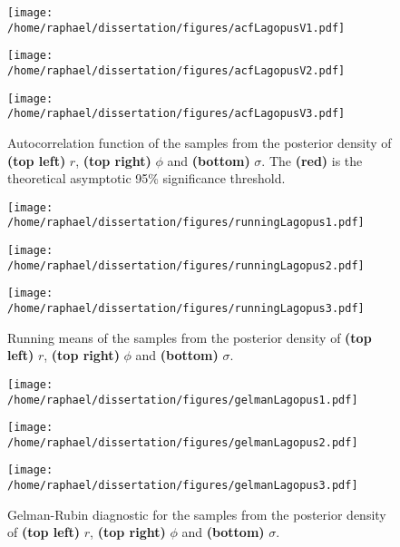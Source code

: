 \documentclass[12pt]{article}
\begin{document}
	\begin{figure}[htb]
		\centering
		\begin{minipage}{0.4\textwidth}
			\centering
			\texttt{[image: /home/raphael/dissertation/figures/acfLagopusV1.pdf]}
		\end{minipage}
		\begin{minipage}{0.4\textwidth}
			\centering
			\texttt{[image: /home/raphael/dissertation/figures/acfLagopusV2.pdf]}
		\end{minipage}
		\begin{minipage}{0.4\textwidth}
			\centering
			\texttt{[image: /home/raphael/dissertation/figures/acfLagopusV3.pdf]}
		\end{minipage}
		\caption{Autocorrelation function of the samples from the posterior density of \textbf{(top left)} $r$, \textbf{(top right)} $\phi$ and \textbf{(bottom)} $\sigma$. The \textbf{(red)} is the theoretical asymptotic 95\% significance threshold.}
		\label{fig:acfLagopus}
	\end{figure}
	
	\begin{figure}[htb]
		\centering
		\begin{minipage}{0.4\textwidth}
			\centering
			\texttt{[image: /home/raphael/dissertation/figures/runningLagopus1.pdf]}
		\end{minipage}
		\begin{minipage}{0.4\textwidth}
			\centering
			\texttt{[image: /home/raphael/dissertation/figures/runningLagopus2.pdf]}
		\end{minipage}
		\begin{minipage}{0.4\textwidth}
			\centering
			\texttt{[image: /home/raphael/dissertation/figures/runningLagopus3.pdf]}
		\end{minipage}
		\caption{Running means of the samples from the posterior density of \textbf{(top left)} $r$, \textbf{(top right)} $\phi$ and \textbf{(bottom)} $\sigma$.}
		\label{fig:rmLagopus}
	\end{figure}
	
	\clearpage
	\begin{figure}[htb]
		\centering
		\begin{minipage}{0.4\textwidth}
			\centering
			\texttt{[image: /home/raphael/dissertation/figures/gelmanLagopus1.pdf]}
		\end{minipage}
		\begin{minipage}{0.4\textwidth}
			\centering
			\texttt{[image: /home/raphael/dissertation/figures/gelmanLagopus2.pdf]}
		\end{minipage}
		\begin{minipage}{0.4\textwidth}
			\centering
			\texttt{[image: /home/raphael/dissertation/figures/gelmanLagopus3.pdf]}
		\end{minipage}
		\caption{Gelman-Rubin diagnostic for the samples from the posterior density of \textbf{(top left)} $r$, \textbf{(top right)} $\phi$ and \textbf{(bottom)} $\sigma$.}
		\label{fig:gelmanLagopus}
	\end{figure}
	
\end{document}
